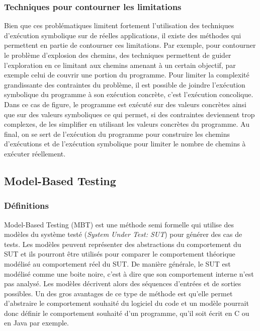 \subsubsection*{Techniques pour contourner les limitations}
Bien que ces problématiques limitent fortement l'utilisation des techniques d'exécution symbolique sur de réelles applications, il existe des méthodes qui permettent en partie de contourner ces limitations. 
Par exemple, pour contourner le problème d'explosion des chemins, des techniques permettent de guider l'exploration en ce limitant aux chemins amenant à un certain objectif, par exemple celui de couvrir une portion du programme.
Pour limiter la complexité grandissante des contraintes du problème, il est possible de joindre l'exécution symbolique du programme à son exécution concrète, c'est l'exécution concolique. Dans ce cas de figure, le programme est exécuté sur des valeurs concrètes ainsi que sur des valeurs symboliques ce qui permet, si des contraintes deviennent trop complexes, de les simplifier en utilisant les valeurs concrètes du programme. Au final, on se sert de l'exécution du programme pour construire les chemins d'exécutions et de l'exécution symbolique pour limiter le nombre de chemins à exécuter réellement.

\subsection{Model-Based Testing}

\subsubsection*{Définitions}
Model-Based Testing (MBT) est une méthode semi formelle qui utilise des modèles du système testé (\textit{System Under Test: SUT}) pour générer des cas de tests.
Les modèles peuvent représenter des abstractions du comportement du SUT et ils pourront être utilisés pour comparer le comportement théorique modélisé au comportement réel du SUT.
De manière générale, le SUT est modélisé comme une boite noire, c'est à dire que son comportement interne n'est pas analysé. Les modèles décrivent alors des séquences d'entrées et de sorties possibles.
Un des gros avantages de ce type de méthode est qu'elle permet d'abstraire le comportement souhaité du logiciel du code et un modèle pourrait donc définir le comportement souhaité d'un programme, qu'il soit écrit en C ou en Java par exemple.

